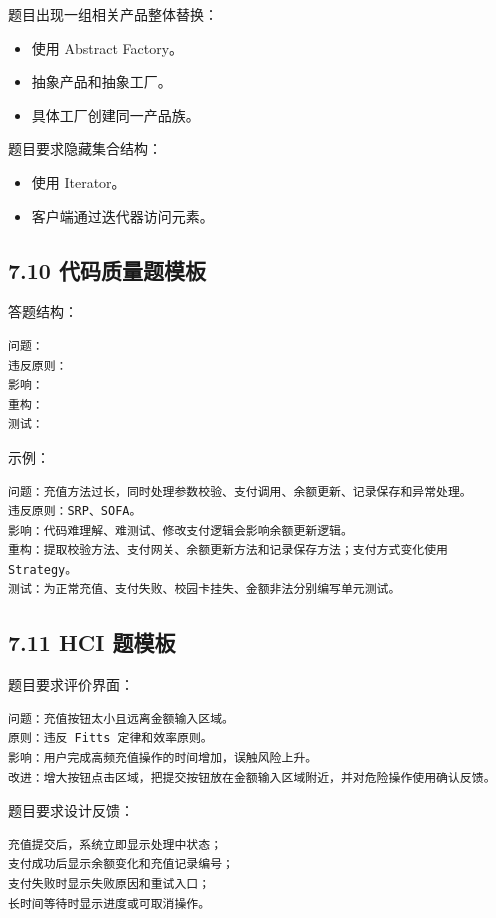 \documentclass[UTF8,zihao=-4]{ctexart}
\begin{document}
题目出现一组相关产品整体替换：

\begin{itemize}
\item 使用 Abstract Factory。
\item 抽象产品和抽象工厂。
\item 具体工厂创建同一产品族。
\end{itemize}

题目要求隐藏集合结构：

\begin{itemize}
\item 使用 Iterator。
\item 客户端通过迭代器访问元素。
\end{itemize}

\subsection{7.10 代码质量题模板}

答题结构：

\small
\begin{verbatim}
问题：
违反原则：
影响：
重构：
测试：
\end{verbatim}
\normalsize

示例：

\small
\begin{verbatim}
问题：充值方法过长，同时处理参数校验、支付调用、余额更新、记录保存和异常处理。
违反原则：SRP、SOFA。
影响：代码难理解、难测试、修改支付逻辑会影响余额更新逻辑。
重构：提取校验方法、支付网关、余额更新方法和记录保存方法；支付方式变化使用 Strategy。
测试：为正常充值、支付失败、校园卡挂失、金额非法分别编写单元测试。
\end{verbatim}
\normalsize

\subsection{7.11 HCI 题模板}

题目要求评价界面：

\small
\begin{verbatim}
问题：充值按钮太小且远离金额输入区域。
原则：违反 Fitts 定律和效率原则。
影响：用户完成高频充值操作的时间增加，误触风险上升。
改进：增大按钮点击区域，把提交按钮放在金额输入区域附近，并对危险操作使用确认反馈。
\end{verbatim}
\normalsize

题目要求设计反馈：

\small
\begin{verbatim}
充值提交后，系统立即显示处理中状态；
支付成功后显示余额变化和充值记录编号；
支付失败时显示失败原因和重试入口；
长时间等待时显示进度或可取消操作。
\end{verbatim}
\normalsize
\end{document}
